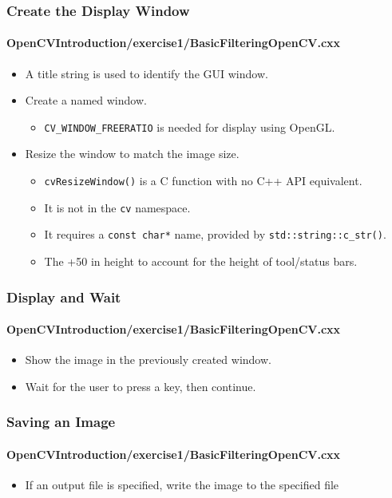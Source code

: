 \begin{frame}
\frametitle{Create the Display Window}
\framesubtitle{OpenCVIntroduction/exercise1/BasicFilteringOpenCV.cxx}
\begin{center}
\begin{itemize}
\item A title string is used to identify the GUI window.
\item Create a named window.
  \begin{itemize}
  \item {\tt\small CV\_WINDOW\_FREERATIO} is needed for display using OpenGL.
  \end{itemize}
\item Resize the window to match the image size.
  \begin{itemize}
  \item {\tt\small cvResizeWindow()} is a C function with no C++ API equivalent.
  \item It is not in the {\tt\small cv} namespace.
  \item It requires a {\tt\small const char*} name, provided by {\tt\small std::string::c\_str()}.
  \item The +50 in height to account for the height of tool/status bars.
  \end{itemize}
\end{itemize}
\end{center}
\end{frame}


\begin{frame}
\frametitle{Display and Wait}
\framesubtitle{OpenCVIntroduction/exercise1/BasicFilteringOpenCV.cxx}
\begin{center}
\begin{itemize}
\item Show the image in the previously created window.
\item Wait for the user to press a key, then continue.
\end{itemize}
\end{center}
\end{frame}


\begin{frame}
\frametitle{Saving an Image}
\framesubtitle{OpenCVIntroduction/exercise1/BasicFilteringOpenCV.cxx}
\begin{center}
\begin{itemize}
\item If an output file is specified, write the image to the specified file
\end{itemize}
\end{center}
\end{frame}


